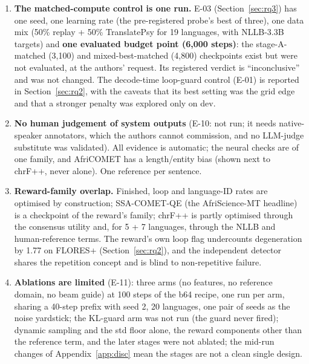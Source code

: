 \begin{enumerate}
\item \textbf{The matched-compute control is one run.} E-03 (Section~\ref{sec:rq3}) has one seed, one learning rate (the pre-registered probe's best of three), one data mix (50\% replay + 50\% TranslatePsy for 19 languages, with NLLB-3.3B targets) and \textbf{one evaluated budget point (6,000 steps)}: the stage-A-matched (3,100) and mixed-best-matched (4,800) checkpoints exist but were not evaluated, at the authors' request. Its registered verdict is ``inconclusive'' and was not changed. The decode-time loop-guard control (E-01) is reported in Section~\ref{sec:rq2}, with the caveats that its best setting was the grid edge and that a stronger penalty was explored only on dev.
\item \textbf{No human judgement of system outputs} (E-10: not run; it needs native-speaker annotators, which the authors cannot commission, and no LLM-judge substitute was validated). All evidence is automatic; the neural checks are of one family, and AfriCOMET has a length/entity bias (shown next to chrF++, never alone). One reference per sentence.
\item \textbf{Reward-family overlap.} Finished, loop and language-ID rates are optimised by construction; SSA-COMET-QE (the AfriScience-MT headline) is a checkpoint of the reward's family; chrF++ is partly optimised through the consensus utility and, for 5 + 7 languages, through the NLLB and human-reference terms. The reward's own loop flag undercounts degeneration by 1.77 on FLORES+ (Section~\ref{sec:rq2}), and the independent detector shares the repetition concept and is blind to non-repetitive failure.
\item \textbf{Ablations are limited} (E-11): three arms (no features, no reference domain, no beam guide) at 100 steps of the b64 recipe, one run per arm, sharing a 40-step prefix with seed 2, 20 languages, one pair of seeds as the noise yardstick; the KL-guard arm was not run (the guard never fired); dynamic sampling and the std floor alone, the reward components other than the reference term, and the later stages were not ablated; the mid-run changes of Appendix~\ref{app:disc} mean the stages are not a clean single design.
\end{enumerate}

